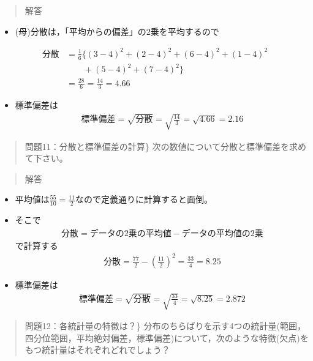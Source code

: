 \documentclass[
]{book}
\providecommand{\tightlist}{%
  \setlength{\itemsep}{0pt}\setlength{\parskip}{0pt}}
\theoremstyle{definition}
\theoremstyle{definition}
\theoremstyle{definition}
\theoremstyle{definition}
\theoremstyle{remark}
\begin{document}
\begin{quote}
解答
\end{quote}

\begin{itemize}
\tightlist
\item
  (母)分散は，「平均からの偏差」の2乗を平均するので
\end{itemize}

\begin{align*}
\text{分散}
&=\frac{1}{6}\{ (3-4)^2+(2-4)^2+(6-4)^2+(1-4)^2 \\
& \qquad+(5-4)^2+(7-4)^2 \}\\
&=\frac{28}{6}=\frac{14}{3}=4.66
\end{align*}

\begin{itemize}
\tightlist
\item
  標準偏差は
  \begin{align*}
  \text{標準偏差}=\sqrt{\text{分散}}=\sqrt{\frac{14}{3}}=\sqrt{4.66}=2.16
  \end{align*}
\end{itemize}

\begin{quote}
問題11：分散と標準偏差の計算\}
次の数値について分散と標準偏差を求めて下さい。
\end{quote}

\begin{quote}
解答
\end{quote}

\begin{itemize}
\tightlist
\item
  平均値は\(\frac{55}{10}=\frac{11}{2}\)なので定義通りに計算すると面倒。
\item
  そこで
  \begin{align*}
  \text{分散}=\text{データの2乗の平均値}-\text{データの平均値の2乗}
  \end{align*}
  で計算する
  \begin{align*}
  \text{分散}=\frac{77}{2}-\left( \frac{11}{2} \right)^2=\frac{33}{4}=8.25
  \end{align*}
\item
  標準偏差は
  \begin{align*}
  \text{標準偏差}=\sqrt{\text{分散}}=\sqrt{\frac{33}{4}}=\sqrt{8.25}=2.872
  \end{align*}
\end{itemize}

\begin{quote}
問題12：各統計量の特徴は？\}
分布のちらばりを示す4つの統計量(範囲，四分位範囲，平均絶対偏差，標準偏差)について，次のような特徴(欠点)をもつ統計量はそれぞれどれでしょう？
\end{quote}
\end{document}
